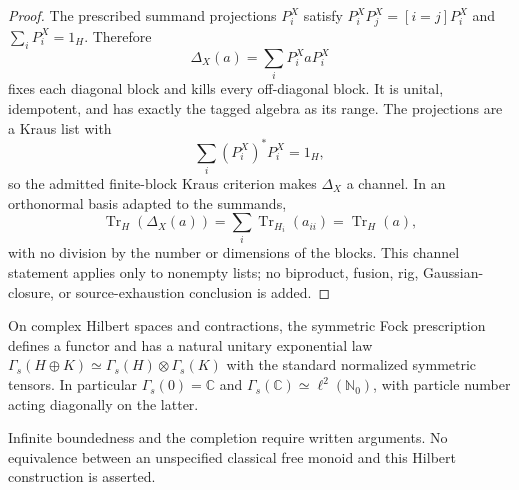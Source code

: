 \begin{proof}
The prescribed summand projections $P_i^X$ satisfy $P_i^X P_j^X=[i=j]P_i^X$ and $\sum_iP_i^X=1_H$.  Therefore
\[
 \Delta_X(a)=\sum_iP_i^X aP_i^X
\]
fixes each diagonal block and kills every off-diagonal block.  It is unital,
idempotent, and has exactly the tagged algebra as its range.  The projections
are a Kraus list with
\[
 \sum_i(P_i^X)^*P_i^X=1_H,
\]
so the admitted finite-block Kraus criterion makes $\Delta_X$ a channel.
In an orthonormal basis adapted to the summands,
\[
 \operatorname{Tr}_H(\Delta_X(a))
 =\sum_i\operatorname{Tr}_{H_i}(a_{ii})
 =\operatorname{Tr}_H(a),
\]
with no division by the number or dimensions of the blocks.  This channel
statement applies only to nonempty lists; no biproduct, fusion, rig,
Gaussian-closure, or source-exhaustion conclusion is added.
\end{proof}

\begin{proposition}
\statusProved{}
On complex Hilbert spaces and contractions, the symmetric Fock prescription defines a
functor and has a natural unitary exponential law $\Gamma_s(H\oplus
K)\simeq\Gamma_s(H)\otimes\Gamma_s(K)$ with the standard normalized symmetric
tensors. In particular $\Gamma_s(0)=\mathbb C$ and $\Gamma_s(\mathbb
C)\simeq\ell^2(\mathbb N_0)$, with particle number acting diagonally on the latter.
\end{proposition}
\begin{scope}
Infinite boundedness and the completion require written arguments. No equivalence between an unspecified classical free monoid and this Hilbert construction is asserted.
\end{scope}

